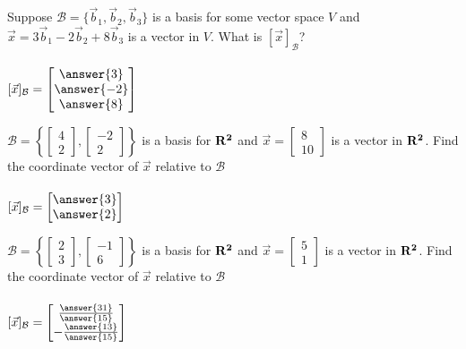\documentclass{ximera}
\newcommand{\RR}{\bf R}
\begin{document}
  \begin{question} Suppose $\mathcal{B} = \{\vec{b}_1, \vec{b}_2, \vec{b}_3\}$ is a basis for some vector space $V$ and $\vec{x} = 3\vec{b}_1 -2\vec{b}_2 +8\vec{b}_3$ is a vector in $V$. What is $[\vec{x}]_{\mathcal{B}}$?\\
  	\\
  $	[\vec{x}]_{\mathcal{B}} = \begin{bmatrix} \answer{3}\\ \answer{-2} \\\answer{8} \end{bmatrix}$
  			
  			
  		\end{question}	
       \begin{question}
       	$\mathcal{B} =\left \{\begin{bmatrix}4\\2\end{bmatrix}, \begin{bmatrix}
       	-2\\2\end{bmatrix}\right\}$ is a basis for $\RR^2$ and $\vec{x} = \begin{bmatrix}
       	8\\10\end{bmatrix}$ is a vector in $\RR^2$. Find the coordinate vector of $\vec{x}$ relative to $\mathcal{B}$\\
       	\\
       	$	[\vec{x}]_{\mathcal{B}} = \begin{bmatrix} \answer{3}\\\answer{2} \end{bmatrix}$
       	
       	
       \end{question}	
    \begin{question}
  		  $\mathcal{B} =\left \{\begin{bmatrix}2\\3\end{bmatrix}, \begin{bmatrix}
  		  -1\\6\end{bmatrix}\right\}$ is a basis for $\RR^2$ and $\vec{x} = \begin{bmatrix}
  		  5\\1\end{bmatrix}$ is a vector in $\RR^2$. Find the coordinate vector of $\vec{x}$ relative to $\mathcal{B}$\\
  		  \\
  		  $	[\vec{x}]_{\mathcal{B}} = \begin{bmatrix} \frac{\answer{31}}{\answer{15}}\\ -\frac{\answer{13}}{\answer{15}}      \end{bmatrix}$
  		  
  		  
  		  
  		\end{question}	
\end{document}
